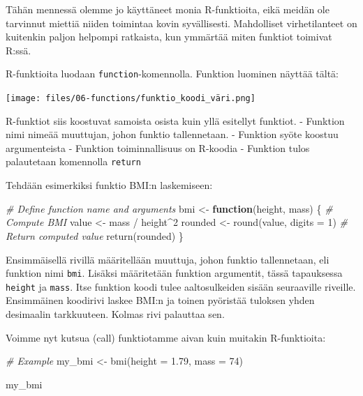 \documentclass[
]{book}
\newenvironment{Shaded}{\begin{snugshade}}{\end{snugshade}}
\newcommand{\AttributeTok}[1]{\textcolor[rgb]{0.77,0.63,0.00}{#1}}
\newcommand{\CommentTok}[1]{\textcolor[rgb]{0.56,0.35,0.01}{\textit{#1}}}
\newcommand{\ControlFlowTok}[1]{\textcolor[rgb]{0.13,0.29,0.53}{\textbf{#1}}}
\newcommand{\DecValTok}[1]{\textcolor[rgb]{0.00,0.00,0.81}{#1}}
\newcommand{\FloatTok}[1]{\textcolor[rgb]{0.00,0.00,0.81}{#1}}
\newcommand{\FunctionTok}[1]{\textcolor[rgb]{0.00,0.00,0.00}{#1}}
\newcommand{\NormalTok}[1]{#1}
\newcommand{\OtherTok}[1]{\textcolor[rgb]{0.56,0.35,0.01}{#1}}
\newcommand{\SpecialCharTok}[1]{\textcolor[rgb]{0.00,0.00,0.00}{#1}}
\begin{document}
Tähän mennessä olemme jo käyttäneet monia R-funktioita, eikä meidän ole tarvinnut miettiä niiden toimintaa kovin syvällisesti. Mahdolliset virhetilanteet on kuitenkin paljon helpompi ratkaista, kun ymmärtää miten funktiot toimivat R:ssä.

R-funktioita luodaan \texttt{function}-komennolla. Funktion luominen näyttää tältä:

\texttt{[image: files/06-functions/funktio\_koodi\_väri.png]}

R-funktiot siis koostuvat samoista osista kuin yllä esitellyt funktiot.
- Funktion nimi nimeää muuttujan, johon funktio tallennetaan.
- Funktion syöte koostuu argumenteista
- Funktion toiminnallisuus on R-koodia
- Funktion tulos palautetaan komennolla \texttt{return}

Tehdään esimerkiksi funktio BMI:n laskemiseen:

\begin{Shaded}
\begin{Highlighting}[]
\CommentTok{\# Define function name and arguments}
\NormalTok{bmi }\OtherTok{\textless{}{-}} \ControlFlowTok{function}\NormalTok{(height, mass) \{}
  \CommentTok{\# Compute BMI}
\NormalTok{  value }\OtherTok{\textless{}{-}}\NormalTok{ mass }\SpecialCharTok{/}\NormalTok{ height}\SpecialCharTok{\^{}}\DecValTok{2}
\NormalTok{  rounded }\OtherTok{\textless{}{-}} \FunctionTok{round}\NormalTok{(value, }\AttributeTok{digits =} \DecValTok{1}\NormalTok{)}
  \CommentTok{\# Return computed value}
  \FunctionTok{return}\NormalTok{(rounded)}
\NormalTok{\}}
\end{Highlighting}
\end{Shaded}

Ensimmäisellä rivillä määritellään muuttuja, johon funktio tallennetaan, eli funktion nimi \texttt{bmi}. Lisäksi määritetään funktion argumentit, tässä tapauksessa \texttt{height} ja \texttt{mass}. Itse funktion koodi tulee aaltosulkeiden sisään seuraaville riveille. Ensimmäinen koodirivi laskee BMI:n ja toinen pyöristää tuloksen yhden desimaalin tarkkuuteen. Kolmas rivi palauttaa sen.

Voimme nyt kutsua (call) funktiotamme aivan kuin muitakin R-funktioita:

\begin{Shaded}
\begin{Highlighting}[]
\CommentTok{\# Example}
\NormalTok{my\_bmi }\OtherTok{\textless{}{-}} \FunctionTok{bmi}\NormalTok{(}\AttributeTok{height =} \FloatTok{1.79}\NormalTok{, }\AttributeTok{mass =} \DecValTok{74}\NormalTok{)}

\NormalTok{my\_bmi}
\end{Highlighting}
\end{Shaded}
\end{document}

